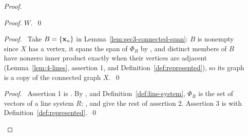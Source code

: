 \begin{proof}
\begin{proof}
  $W$.~\qed\end{proof}
 \begin{proof}\pf\ Take $B=\{{\mathbf x}_u\}$ in Lemma~\ref{lem:sec3-connected-span}: $B$ is nonempty
  since $X$ has a vertex, it spans the span of $\Phi_R$ by , and distinct
  members of $B$ have nonzero inner product exactly when their vertices are adjacent
  (Lemma~\ref{lem:4-lines}, assertion 1, and Definition~\ref{def:represented}), so its graph is a
  copy of the connected graph $X$.~\qed\end{proof}
 \qedstep
 \begin{proof}\pf\ Assertion 1 is . By ,
   and Definition~\ref{def:line-system}, $\Phi_R$ is the set of vectors of a
  line system $R$; ,  and  give the
  rest of assertion 2. Assertion 3 is  with
  Definition~\ref{def:represented}.~\qed\end{proof}
\end{proof}


